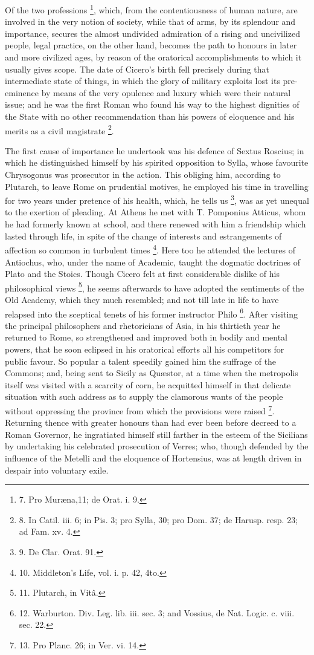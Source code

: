 Of the two professions \footnote{7.
Pro Muræna,11; de Orat. i. 9.}, which, from the contentiousness of human nature, are involved
in the very notion of society, while that of arms, by its splendour
and importance, secures the almost undivided admiration of a rising
and uncivilized people, legal practice, on the other hand, becomes the
path to honours in later and more civilized ages, by reason of the
oratorical accomplishments to which it usually gives scope. The date
of Cicero's birth fell precisely during that intermediate state of
things, in which the glory of military exploits lost its
pre-eminence by means of the very opulence and luxury which were their
natural issue; and he was the first Roman who found his way to the
highest dignities of the State with no other recommendation than his
powers of eloquence and his merits as a civil magistrate \footnote{8. In Catil. iii. 6; in Pis.
3; pro Sylla, 30; pro Dom. 37; de Harusp. resp. 23; ad Fam. xv. 4.}.

The first cause of importance
he undertook was his defence of Sextus Roscius; in which he
distinguished himself by his spirited opposition to Sylla, whose
favourite Chrysogonus was prosecutor in the action. This obliging him,
according to Plutarch, to leave Rome on prudential motives, he
employed his time in travelling for two years under pretence of his
health, which, he tells us \footnote{9. De
Clar. Orat. 91.},
was as yet unequal to the exertion of pleading. At Athens he met with
T. Pomponius Atticus, whom he had formerly known at school, and there
renewed with him a friendship which lasted through life, in spite of
the change of interests and estrangements of affection so common in
turbulent times \footnote{10. Middleton's Life, vol. i.
p. 42, 4to.}. Here
too he attended the lectures of Antiochus, who, under the name of
Academic, taught the dogmatic doctrines of Plato and the Stoics.
Though Cicero felt at first considerable dislike of his philosophical
views \footnote{11. Plutarch, in
Vitâ.}, he seems
afterwards to have adopted the sentiments of the Old Academy, which
they much resembled; and not till late in life to have relapsed into
the sceptical tenets of his former instructor Philo \footnote{12. Warburton. Div. Leg. lib.
iii. sec. 3; and Vossius, de Nat. Logic. c. viii. sec. 22.}. After visiting the principal philosophers and rhetoricians of
Asia, in his thirtieth year he returned to Rome, so strengthened and
improved both in bodily and mental powers, that he soon eclipsed
in his oratorical efforts all his competitors for public favour. So
popular a talent speedily gained him the suffrage of the Commons; and,
being sent to Sicily as Quæstor, at a time when the metropolis itself
was visited with a scarcity of corn, he acquitted himself in that
delicate situation with such address as to supply the clamorous wants
of the people without oppressing the province from which the
provisions were raised \footnote{13. Pro Planc. 26; in Ver. vi.
14.}.
Returning thence with greater honours than had ever been before
decreed to a Roman Governor, he ingratiated himself still farther in
the esteem of the Sicilians by undertaking his celebrated prosecution
of Verres; who, though defended by the influence of the Metelli and
the eloquence of Hortensius, was at length driven in despair into
voluntary exile.

